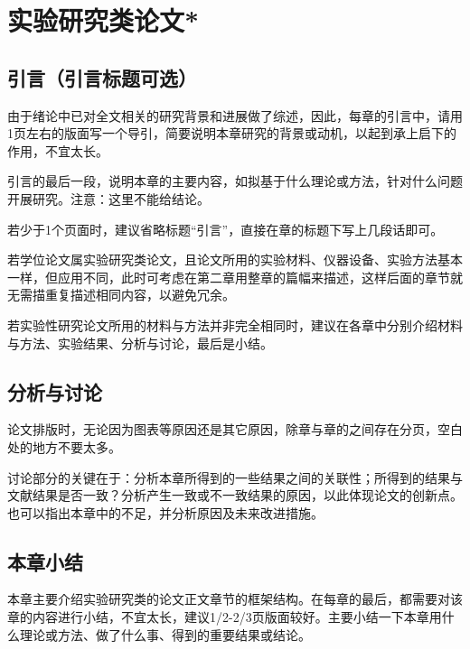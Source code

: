 \chapter{实验研究类论文*}
\label{cha:thirdsection}


\section{引言（引言标题可选）}
\label{sec:method}
由于绪论中已对全文相关的研究背景和进展做了综述，因此，每章的引言中，请用1页左右的版面写一个导引，简要说明本章研究的背景或动机，以起到承上启下的作用，不宜太长。

引言的最后一段，说明本章的主要内容，如拟基于什么理论或方法，针对什么问题开展研究。注意：这里不能给结论。

若少于1个页面时，建议省略标题“引言”，直接在章的标题下写上几段话即可。

若学位论文属实验研究类论文，且论文所用的实验材料、仪器设备、实验方法基本一样，但应用不同，此时可考虑在第二章用整章的篇幅来描述，这样后面的章节就无需描重复描述相同内容，以避免冗余。

若实验性研究论文所用的材料与方法并非完全相同时，建议在各章中分别介绍材料与方法、实验结果、分析与讨论，最后是小结。




\section{分析与讨论}
论文排版时，无论因为图表等原因还是其它原因，除章与章的之间存在分页，空白处的地方不要太多。

讨论部分的关键在于：分析本章所得到的一些结果之间的关联性；所得到的结果与文献结果是否一致？分析产生一致或不一致结果的原因，以此体现论文的创新点。也可以指出本章中的不足，并分析原因及未来改进措施。

\section{本章小结}
本章主要介绍实验研究类的论文正文章节的框架结构。在每章的最后，都需要对该章的内容进行小结，不宜太长，建议1/2-2/3页版面较好。主要小结一下本章用什么理论或方法、做了什么事、得到的重要结果或结论。
